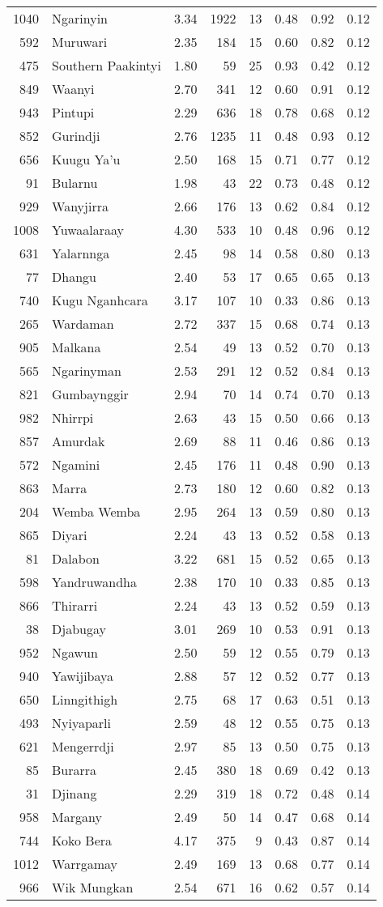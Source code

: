\begin{longtable}[]{@{}rlrrrrrr@{}}
1040 & Ngarinyin & 3.34 & 1922 & 13 & 0.48 & 0.92 & 0.12\tabularnewline
592 & Muruwari & 2.35 & 184 & 15 & 0.60 & 0.82 & 0.12\tabularnewline
475 & Southern Paakintyi & 1.80 & 59 & 25 & 0.93 & 0.42 &
0.12\tabularnewline
849 & Waanyi & 2.70 & 341 & 12 & 0.60 & 0.91 & 0.12\tabularnewline
943 & Pintupi & 2.29 & 636 & 18 & 0.78 & 0.68 & 0.12\tabularnewline
852 & Gurindji & 2.76 & 1235 & 11 & 0.48 & 0.93 & 0.12\tabularnewline
656 & Kuugu Ya'u & 2.50 & 168 & 15 & 0.71 & 0.77 & 0.12\tabularnewline
91 & Bularnu & 1.98 & 43 & 22 & 0.73 & 0.48 & 0.12\tabularnewline
929 & Wanyjirra & 2.66 & 176 & 13 & 0.62 & 0.84 & 0.12\tabularnewline
1008 & Yuwaalaraay & 4.30 & 533 & 10 & 0.48 & 0.96 & 0.12\tabularnewline
631 & Yalarnnga & 2.45 & 98 & 14 & 0.58 & 0.80 & 0.13\tabularnewline
77 & Dhangu & 2.40 & 53 & 17 & 0.65 & 0.65 & 0.13\tabularnewline
740 & Kugu Nganhcara & 3.17 & 107 & 10 & 0.33 & 0.86 &
0.13\tabularnewline
265 & Wardaman & 2.72 & 337 & 15 & 0.68 & 0.74 & 0.13\tabularnewline
905 & Malkana & 2.54 & 49 & 13 & 0.52 & 0.70 & 0.13\tabularnewline
565 & Ngarinyman & 2.53 & 291 & 12 & 0.52 & 0.84 & 0.13\tabularnewline
821 & Gumbaynggir & 2.94 & 70 & 14 & 0.74 & 0.70 & 0.13\tabularnewline
982 & Nhirrpi & 2.63 & 43 & 15 & 0.50 & 0.66 & 0.13\tabularnewline
857 & Amurdak & 2.69 & 88 & 11 & 0.46 & 0.86 & 0.13\tabularnewline
572 & Ngamini & 2.45 & 176 & 11 & 0.48 & 0.90 & 0.13\tabularnewline
863 & Marra & 2.73 & 180 & 12 & 0.60 & 0.82 & 0.13\tabularnewline
204 & Wemba Wemba & 2.95 & 264 & 13 & 0.59 & 0.80 & 0.13\tabularnewline
865 & Diyari & 2.24 & 43 & 13 & 0.52 & 0.58 & 0.13\tabularnewline
81 & Dalabon & 3.22 & 681 & 15 & 0.52 & 0.65 & 0.13\tabularnewline
598 & Yandruwandha & 2.38 & 170 & 10 & 0.33 & 0.85 & 0.13\tabularnewline
866 & Thirarri & 2.24 & 43 & 13 & 0.52 & 0.59 & 0.13\tabularnewline
38 & Djabugay & 3.01 & 269 & 10 & 0.53 & 0.91 & 0.13\tabularnewline
952 & Ngawun & 2.50 & 59 & 12 & 0.55 & 0.79 & 0.13\tabularnewline
940 & Yawijibaya & 2.88 & 57 & 12 & 0.52 & 0.77 & 0.13\tabularnewline
650 & Linngithigh & 2.75 & 68 & 17 & 0.63 & 0.51 & 0.13\tabularnewline
493 & Nyiyaparli & 2.59 & 48 & 12 & 0.55 & 0.75 & 0.13\tabularnewline
621 & Mengerrdji & 2.97 & 85 & 13 & 0.50 & 0.75 & 0.13\tabularnewline
85 & Burarra & 2.45 & 380 & 18 & 0.69 & 0.42 & 0.13\tabularnewline
31 & Djinang & 2.29 & 319 & 18 & 0.72 & 0.48 & 0.14\tabularnewline
958 & Margany & 2.49 & 50 & 14 & 0.47 & 0.68 & 0.14\tabularnewline
744 & Koko Bera & 4.17 & 375 & 9 & 0.43 & 0.87 & 0.14\tabularnewline
1012 & Warrgamay & 2.49 & 169 & 13 & 0.68 & 0.77 & 0.14\tabularnewline
966 & Wik Mungkan & 2.54 & 671 & 16 & 0.62 & 0.57 & 0.14\tabularnewline

\end{longtable}
